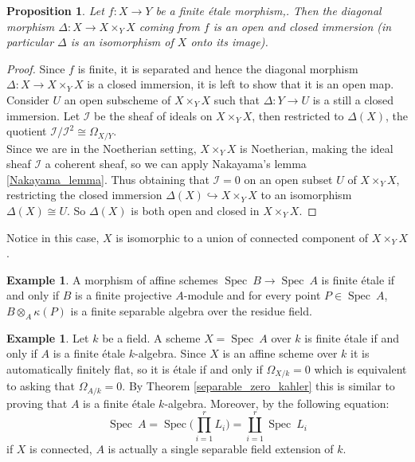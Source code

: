 \documentclass{article}
\theoremstyle{plain}
\newtheorem{proposition}[theorem]{Proposition}
\theoremstyle{definition}
\newtheorem{example}[theorem]{Example}
\DeclareMathOperator{\Spec}{Spec}
\begin{document}
\begin{proposition}
\label{clopen_immersion}
    Let $f:X\rightarrow Y$ be a finite \'etale morphism,. 
    Then the diagonal morphism $\Delta : X\rightarrow X\times_YX$ coming from $f$ is an open and closed immersion (in particular $\Delta$ is an isomorphism of $X$ onto its image).
\end{proposition}
\begin{proof}
    Since $f$ is finite, it is separated and hence the diagonal morphism $\Delta : X\rightarrow X\times_YX$ is a closed immersion, 
    it is left to show that it is an open map. 
    Consider $U$ an open subscheme of $X\times_YX$ such that $\Delta:Y\rightarrow U$ is a still a closed immersion.
    Let $\mathcal{I}$ be the sheaf of ideals on $X\times_YX$, then restricted to $\Delta(X)$, the quotient $\mathcal{I}/\mathcal{I}^2\cong \Omega_{X/Y}$. \\
    Since we are in the Noetherian setting, $X\times_YX$ is Noetherian, making the ideal sheaf $\mathcal{I}$ a coherent sheaf, so we can apply Nakayama's lemma \ref{Nakayama_lemma}. 
    Thus obtaining that $\mathcal{I}=0$ on an open subset $U$ of $X\times_YX$, restricting the closed immersion $\Delta(X) \hookrightarrow X\times_YX$ to an isomorphism $\Delta(X) \cong U$. So $\Delta(X)$ is both open and closed in $X\times_YX$.
\end{proof}

\noindent Notice in this case, $X$ is isomorphic to a union of connected component of $X\times_YX$.

\begin{example}
    A morphism of affine schemes $\Spec\:B \rightarrow \Spec\: A$ is finite \'etale if and only if $B$ is a finite projective $A$-module and for every point $P\in \Spec\:A$, $B\otimes_A\kappa(P)$ is a finite separable algebra over the residue field.
\end{example}


\begin{example}
\label{example_etale_over_field}
    Let $k$ be a field.
    A scheme $X=\Spec\:A$ over $k$ is finite \'etale if and only if $A$ is a finite \'etale $k$-algebra.
    Since $X$ is an affine scheme over $k$ it is automatically finitely flat, so it is \'etale if and only if $\Omega_{X/k} = 0$ which is equivalent to asking that $\Omega_{A/k}=0$. By Theorem \ref{separable_zero_kahler} this is similar to proving that $A$ is a finite \'etale $k$-algebra.
    Moreover, by the following equation:
    $$\Spec\: A = \Spec \Big( \prod_{i=1}^r L_i\Big) = \coprod_{i=1}^r \Spec\:L_i$$
    if $X$ is connected, $A$ is actually a single separable field extension of $k$.
\end{example}
\end{document}
